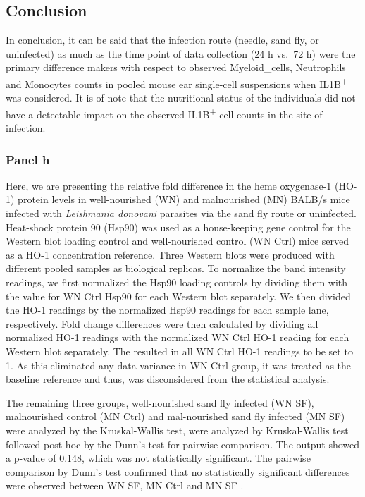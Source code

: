 \documentclass[
  12pt,
  letterpaper,
]{article}
\begin{document}
\subsection{Conclusion}\label{conclusion-1}

In conclusion, it can be said that the infection route (needle, sand fly, or uninfected) as much as the time point of data collection (24 h vs.~72 h) were the primary difference makers with respect to observed Myeloid\_cells, Neutrophils and Monocytes counts in pooled mouse ear single-cell suspensions when IL1B\textsuperscript{+} was considered. It is of note that the nutritional status of the individuals did not have a detectable impact on the observed IL1B\textsuperscript{+} cell counts in the site of infection.

\subsubsection{Panel h}\label{panel-h}

Here, we are presenting the relative fold difference in the heme oxygenase-1 (HO-1) protein levels in well-nourished (WN) and malnourished (MN) BALB/s mice infected with \emph{Leishmania donovani} parasites via the sand fly route or uninfected. Heat-shock protein 90 (Hsp90) was used as a house-keeping gene control for the Western blot loading control and well-nourished control (WN Ctrl) mice served as a HO-1 concentration reference. Three Western blots were produced with different pooled samples as biological replicas. To normalize the band intensity readings, we first normalized the Hsp90 loading controls by dividing them with the value for WN Ctrl Hsp90 for each Western blot separately. We then divided the HO-1 readings by the normalized Hsp90 readings for each sample lane, respectively. Fold change differences were then calculated by dividing all normalized HO-1 readings with the normalized WN Ctrl HO-1 reading for each Western blot separately. The resulted in all WN Ctrl HO-1 readings to be set to 1. As this eliminated any data variance in WN Ctrl group, it was treated as the baseline reference and thus, was disconsidered from the statistical analysis.

The remaining three groups, well-nourished sand fly infected (WN SF), malnourished control (MN Ctrl) and mal-nourished sand fly infected (MN SF) were analyzed by the Kruskal-Wallis test, were analyzed by Kruskal-Wallis test followed post hoc by the Dunn's test for pairwise comparison. The output showed a p-value of 0.148, which was not statistically significant. The pairwise comparison by Dunn's test confirmed that no statistically significant differences were observed between WN SF, MN Ctrl and MN SF .
\end{document}
